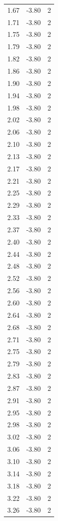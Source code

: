 \begin{longtable}{lrr}
  1.67 & -3.80 & 2 \\
  1.71 & -3.80 & 2 \\
  1.75 & -3.80 & 2 \\
  1.79 & -3.80 & 2 \\
  1.82 & -3.80 & 2 \\
  1.86 & -3.80 & 2 \\
  1.90 & -3.80 & 2 \\
  1.94 & -3.80 & 2 \\
  1.98 & -3.80 & 2 \\
  2.02 & -3.80 & 2 \\
  2.06 & -3.80 & 2 \\
  2.10 & -3.80 & 2 \\
  2.13 & -3.80 & 2 \\
  2.17 & -3.80 & 2 \\
  2.21 & -3.80 & 2 \\
  2.25 & -3.80 & 2 \\
  2.29 & -3.80 & 2 \\
  2.33 & -3.80 & 2 \\
  2.37 & -3.80 & 2 \\
  2.40 & -3.80 & 2 \\
  2.44 & -3.80 & 2 \\
  2.48 & -3.80 & 2 \\
  2.52 & -3.80 & 2 \\
  2.56 & -3.80 & 2 \\
  2.60 & -3.80 & 2 \\
  2.64 & -3.80 & 2 \\
  2.68 & -3.80 & 2 \\
  2.71 & -3.80 & 2 \\
  2.75 & -3.80 & 2 \\
  2.79 & -3.80 & 2 \\
  2.83 & -3.80 & 2 \\
  2.87 & -3.80 & 2 \\
  2.91 & -3.80 & 2 \\
  2.95 & -3.80 & 2 \\
  2.98 & -3.80 & 2 \\
  3.02 & -3.80 & 2 \\
  3.06 & -3.80 & 2 \\
  3.10 & -3.80 & 2 \\
  3.14 & -3.80 & 2 \\
  3.18 & -3.80 & 2 \\
  3.22 & -3.80 & 2 \\
  3.26 & -3.80 & 2 \\

\end{longtable}
